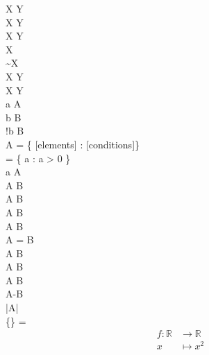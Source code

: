 X \implies Y  \\
X \impliedby Y \\
X \iff Y \\
\neg X \\
\sim X \\
X \land Y \\
X \lor Y \\
\forall a \in A \\
\exists b \in B \\
\exists !b \in B \\


A = \{ [elements] : [conditions]\} \\

 = \{ a \in {} : a > 0 \} \\

a \in A \\
A \subseteq B \\
A \subset B  \\
A \supseteq B \\
A \supset B  \\
A = B  \\
A \cong B \\
A \cup B \\
A \cap B \\
A-B \\
|A| \\
\{\} = \varnothing \\


\begin{align*}
	f \colon \mathbb{R} &\to \mathbb{R} \\
	x &\mapsto x^2
\end{align*}


\usepackage{tikz}
\usetikzlibrary{cd}
~ 
\usepackage{mathtools,halloweenmath}

